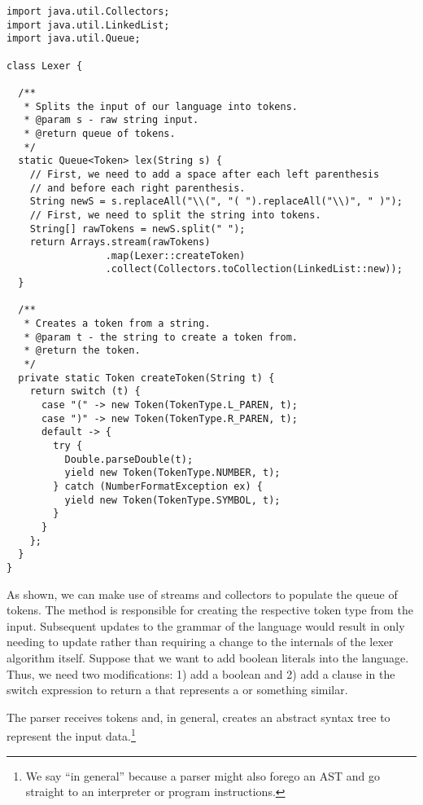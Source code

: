 \begin{lstlisting}[language=MyJava]
import java.util.Collectors;
import java.util.LinkedList;
import java.util.Queue;

class Lexer {

  /**
   * Splits the input of our language into tokens.
   * @param s - raw string input.
   * @return queue of tokens.
   */
  static Queue<Token> lex(String s) {
    // First, we need to add a space after each left parenthesis 
    // and before each right parenthesis.
    String newS = s.replaceAll("\\(", "( ").replaceAll("\\)", " )");
    // First, we need to split the string into tokens.
    String[] rawTokens = newS.split(" ");
    return Arrays.stream(rawTokens)
                 .map(Lexer::createToken)
                 .collect(Collectors.toCollection(LinkedList::new));
  }

  /**
   * Creates a token from a string.
   * @param t - the string to create a token from.
   * @return the token.
   */
  private static Token createToken(String t) {
    return switch (t) {
      case "(" -> new Token(TokenType.L_PAREN, t);
      case ")" -> new Token(TokenType.R_PAREN, t);
      default -> {
        try {
          Double.parseDouble(t);
          yield new Token(TokenType.NUMBER, t);
        } catch (NumberFormatException ex) {
          yield new Token(TokenType.SYMBOL, t);
        }
      }
    };
  }
}
\end{lstlisting}

As shown, we can make use of streams and collectors to populate the queue of tokens. 
The  method is responsible for creating the respective token type from the input. 
Subsequent updates to the grammar of the language would result in only needing to update  rather than requiring a change to the internals of the lexer algorithm itself. 
Suppose that we want to add boolean literals into the language. Thus, we need two modifications: 1) add a boolean  and 2) add a clause in the switch expression to return a  that represents a  or something similar.

The parser receives tokens and, in general, creates an abstract syntax tree to represent the input data.\footnote{We say ``in general'' because a parser might also forego an AST and go straight to an interpreter or program instructions.}

